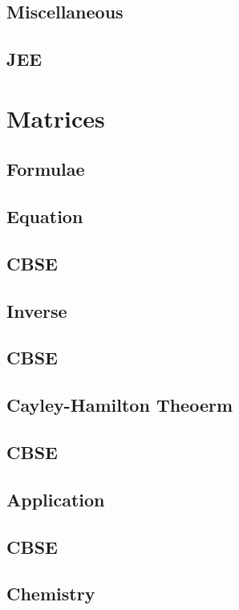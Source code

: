 \documentclass[journal]{IEEEtran}
\begin{document}
\subsection{Miscellaneous }

\subsection{JEE}

\newpage
\section{Matrices}
\subsection{Formulae}

\subsection{Equation}

\subsection{CBSE}

\subsection{Inverse}

\subsection{CBSE}

\subsection{Cayley-Hamilton Theoerm}

\subsection{CBSE}

\subsection{Application}

\subsection{CBSE}

\subsection{Chemistry}

\end{document}

